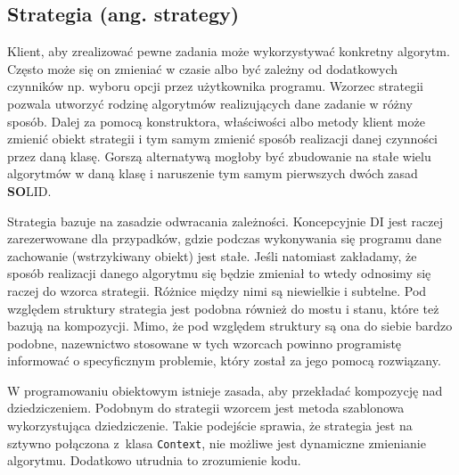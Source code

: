 \subsection{Strategia (ang. strategy)}

Klient, aby zrealizować pewne zadania może wykorzystywać konkretny algorytm. Często może się on zmieniać w czasie albo być zależny od dodatkowych czynników np. wyboru opcji przez użytkownika programu. Wzorzec strategii pozwala utworzyć rodzinę algorytmów realizujących dane zadanie w różny sposób. Dalej za pomocą konstruktora, właściwości albo metody klient może zmienić obiekt strategii i tym samym zmienić sposób realizacji danej czynności przez daną klasę. Gorszą alternatywą mogłoby być zbudowanie na stałe wielu algorytmów w daną klasę i naruszenie tym samym pierwszych dwóch zasad \textbf{SO}LID. 

Strategia bazuje na zasadzie odwracania zależności. Koncepcyjnie DI jest raczej zarezerwowane dla przypadków, gdzie podczas wykonywania się programu dane zachowanie (wstrzykiwany obiekt) jest stałe. Jeśli natomiast zakładamy, że sposób realizacji danego algorytmu się będzie zmieniał to wtedy odnosimy się raczej do wzorca strategii. Różnice między nimi są niewielkie i subtelne. Pod względem struktury strategia jest podobna również do mostu i stanu, które też bazują na kompozycji. Mimo, że pod względem struktury są ona do siebie bardzo podobne, nazewnictwo stosowane w tych wzorcach powinno programistę informować o specyficznym problemie, który został za jego pomocą rozwiązany.

W programowaniu obiektowym istnieje zasada, aby przekładać kompozycję nad dziedziczeniem. Podobnym do strategii wzorcem jest metoda szablonowa wykorzystująca dziedziczenie. Takie podejście sprawia, że strategia jest na sztywno połączona z~klasa \texttt{Context}, nie możliwe jest dynamiczne zmienianie algorytmu. Dodatkowo utrudnia to zrozumienie kodu. 



